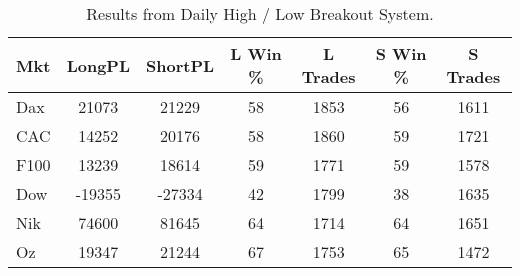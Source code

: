 \begin{table}[ht]
\centering
\caption[Daily High / Low Breakout System]{Results from Daily High / Low Breakout System.} 
\label{tab:hl_bout_sys}
\begin{tabular}{lcccccc}
  \toprule Mkt & LongPL & ShortPL & L Win \% & L Trades & S Win \% & S Trades \\ 
  \midrule Dax & 21073 & 21229 & 58 & 1853 & 56 & 1611 \\ 
  CAC & 14252 & 20176 & 58 & 1860 & 59 & 1721 \\ 
  F100 & 13239 & 18614 & 59 & 1771 & 59 & 1578 \\ 
  Dow & -19355 & -27334 & 42 & 1799 & 38 & 1635 \\ 
  Nik & 74600 & 81645 & 64 & 1714 & 64 & 1651 \\ 
  Oz & 19347 & 21244 & 67 & 1753 & 65 & 1472 \\ 
   \bottomrule \end{tabular}
\end{table}
